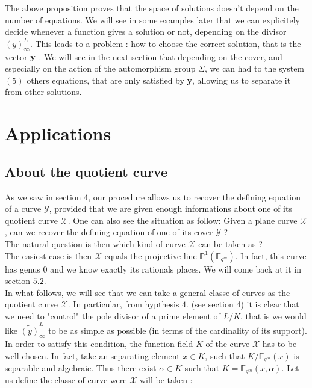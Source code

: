 \documentclass[10pt]{article}
\newcommand{\s}{\vspace{0.3cm}}
\newcommand{\fqm}{\mathbb{F}_{q^m}}
\newcommand{\X}{\mathcal{X}}
\newcommand{\Y}{\mathcal{Y}}
\begin{document}
\s

The above proposition proves that the space of solutions doesn't depend on the number of equations. 
We will see in some examples later that we can explicitely decide whenever a function gives a solution or not, depending on the divisor $(y)^L_{\infty}$. This leads to a problem : how to choose the correct solution, that is the vector $\bf{y}$ \rm. We will see in the next section that depending on the cover, and especially on the action of the automorphism group $\Sigma$,  we can had to the system $(5)$ others equations, that are only satisfied by \textbf{y}, allowing us to separate it from other solutions.

\s
\section{Applications}

\s

\subsection{About the quotient curve}

\s


As we saw in section 4, our procedure allows us to recover the defining equation of a curve $\Y$, provided that we are given enough informations about one of its quotient curve $\X$. One can also see the situation as follow: Given a plane curve $\X$, can we recover the defining equation of one of its cover $\Y$ ? \\ The natural question is then which kind of curve $\X$ can be taken as ? \\

The easiest case is then $\X$ equals the projective line $\mathbb{P}^1(\fqm)$. In fact, this curve has genus 0 and we know exactly its rationals places. We will come back at it in section $5.2$.
\\

In what follows, we will see that we can take a general classe of curves as the quotient curve $\X$. In particular, from hypthesis $4.$ (see section 4) it is clear that we need to "control" the pole divisor of a prime element of $L/K$, that is we would like $\widetilde{(y)}^L_{\infty}$ to be as simple as possible (in terms of the cardinality of its support). In order to satisfy this condition, the function field $K$ of the curve $\X$ has to be well-chosen. In fact, take an separating element $x \in K$, such that $K/\fqm(x)$ is separable and algebraic. Thus there exist $\alpha \in K$ such that $K=\fqm(x,\alpha)$. Let us define the classe of curve were $\X$ will be taken :
\end{document}
